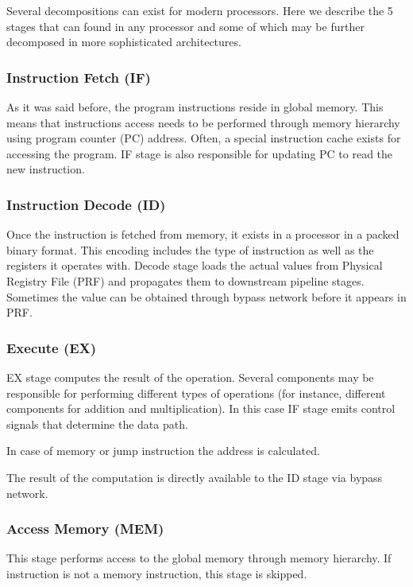 Several decompositions can exist for modern processors. Here we describe the 5 stages that can found in any processor and some of which may be further decomposed in more sophisticated architectures.

\subsubsection{Instruction Fetch (IF)}

As it was said before, the program instructions reside in global memory. This means that instructions access needs to be performed through memory hierarchy using program counter (PC) address. Often, a special instruction cache exists for accessing the program. IF stage is also responsible for updating PC to read the new instruction.

\subsubsection{Instruction Decode (ID)}

Once the instruction is fetched from memory, it exists in a processor in a packed binary format. This encoding includes the type of instruction as well as the registers it operates with. Decode stage loads the actual values from Physical Registry File (PRF) and propagates them to downstream pipeline stages. Sometimes the value can be obtained through bypass network before it appears in PRF.

\subsubsection{Execute (EX)}

EX stage computes the result of the operation. Several components may be responsible for performing different types of operations (for instance, different components for addition and multiplication). In this case IF stage emits control signals that determine the data path.

In case of memory or jump instruction the address is calculated.

The result of the computation is directly available to the ID stage via bypass network.

\subsubsection{Access Memory (MEM)}

This stage performs access to the global memory through memory hierarchy. If instruction is not a memory instruction, this stage is skipped.

